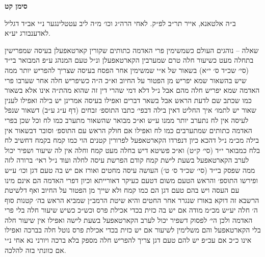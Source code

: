 \documentclass[12pt, openany]{book}
\newcommand{\chapname}{}
\newcommand{\newchap}[1]{
	\addcontentsline{toc}{chapter}{#1}
	\renewcommand{\chapname}{#1}
		\begin{center}
			\textbf{%
\fontsize{16pt}{16pt}\selectfont
				#1}
		\end{center}
}
\begin{document}
\newchap{סימן קט}
\begin{multicols}{2}
ב״ה אלטאנא, אייר תר״ב לפ״ק. לאחי הרה״ג וכו׳ מ״ה ליב עטטלינגער נ״י אב״ד דגליל לאדענבורג יע״א.\\\vspace{0pt}

שאלה – נוהגים העולם כשמשימין פרי האדמה כתותים שקורין קארטאפעלן בעיסה שמפרישין בתחלה מעט כשיעור חלה טרם שמערבין הקארטאפעלן ונ״ל טעם המנהג ע״פ המבואר בי״ד (סי׳ שכ״ד ס׳ י״א) בשאור של א״י שמשימין אחר הפסח בעיסה שצריך להפריש יותר ממה שיש בהשאור שמא יפריש מן הפטור על החיוב וא״כ ה״ה כשיפריש חלה אחר שערבו פרי האדמה שמא יפריש חלה מהם אבל נ״ל דלא דמי שהרי דין זה שהוא מהת״ה אינו אלא בשאור כמו שכתב שם לדעת הראש אבל בשאר דברים ואפילו בעיסה אמרינן יש בילה ואפילו לענין שאור יש לתמו׳ איך החליט דאין בילה דבפי׳ כתבו התוספ׳ זבחים (דף ע״ג ע״ב) דשאור שנפל לעיסה אין לח נתערב יותר ממנו ע״ש וא״כ מבואר שהשאור מתערב כמו לח וכל שכן בפרי האדמה כתותים שמתערבים כמו לח ואפילו אם חולק הראש עם התוספ׳ וסובר דבשאור אין בילה מכ״מ נ״ל דהכא כיון דנפרדו הקארטאפעל לפרורין קטנים הוי כמו קמח בקמח דחשיב לח בלח כמבואר י״ד (סי׳ ק״ט) וא״כ פשיטא דיש בחלה מעט קמח וחלה אין לה שיעור ושפיר יכול לערב הקארטאפעל בשעת לישת קמח קודם הפרשת עיסה לחלה ועוד נ״ל ראי׳ ברורה לזה ממה שפסק בי״ד (סי׳ שכ״ד ס׳ ט׳) העושה עיסה מחטים ואורז אם יש בה טעם דגן וכו׳ ע״ש ופירשו התוספ׳ והראש הטעם משום דטעם כעיקר דאורייתא וכיון דפרי האדמה הם אינם מינו עם העסה ויש בהם טעם דגן הם כמו קמח ולא שייך מן הפטור על החיוב ואף דלשיטת הרשבא זה דוקא באורז שנגרר אחר החטים והיא שיטת הרמב״ן שמביא הראש בה׳ קטנות סוף ה׳ חלה יע״ש מכ״מ מודה אם יש בה כזית בכדי אכילת פרס וכש״כ כשיש שיעור חלה בלי פרי האדמה ולכן הי׳ לפסוק דשפיר יכול לערב הקארטאפעל בשעת לישה ואפילו אין שיעור חלה בלי הקארטאפעל והם משלימין לשיעור אם יש כזית בכדי אכילת פרס נוטל חלה בברכה ואפילו אינו כ״כ אם עכ״פ יש להם טעם דגן צריך להפריש חלה מספק בלא ברכה ויורני נא אחי נ״י אם כוונתי בזה להלכה.\\\vspace{0pt}


\end{multicols}
\end{document}

